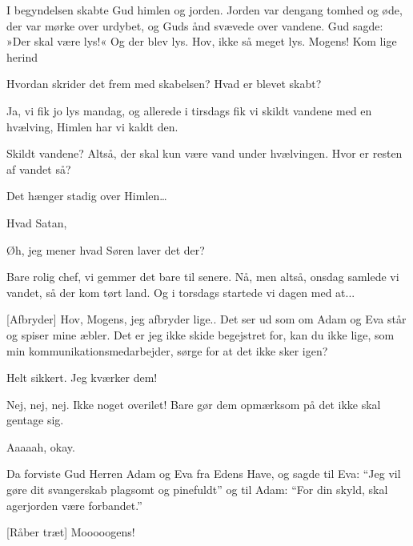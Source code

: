 \documentclass[a4paper,11pt]{article}
\begin{document}
\begin{sketch}

 I begyndelsen skabte Gud himlen og jorden. Jorden var dengang tomhed og øde, der var mørke over urdybet, og Guds ånd svævede over vandene. Gud sagde: »Der skal være lys!« Og der blev lys.
 Hov, ikke så meget lys.
 Mogens! Kom lige herind


 Hvordan skrider det frem med skabelsen? Hvad er blevet skabt?

 Ja, vi fik jo lys mandag, og allerede i tirsdags fik vi skildt vandene med en hvælving, Himlen har vi kaldt den.

 Skildt vandene? Altså, der skal kun være vand under hvælvingen. Hvor er resten af vandet så?

 Det hænger stadig over Himlen…

 Hvad Satan,


 Øh, jeg mener hvad Søren laver det der?


 Bare rolig chef, vi gemmer det bare til senere.  Nå, men altså, onsdag samlede vi vandet, så der kom tørt land. Og i torsdags startede vi dagen med at... 

[Afbryder] Hov, Mogens, jeg afbryder lige.. Det ser ud som om Adam og Eva står og spiser mine æbler. Det er jeg ikke skide begejstret for, kan du ikke lige, som min kommunikationsmedarbejder, sørge for at det ikke sker igen? 


 Helt sikkert. Jeg kværker dem!

 Nej, nej, nej. Ikke noget overilet! Bare gør dem opmærksom på det ikke skal gentage sig.

 Aaaaah, okay. 

 Da forviste Gud Herren Adam og Eva fra Edens Have, og sagde til Eva: “Jeg vil gøre dit svangerskab plagsomt og pinefuldt” og til Adam: “For din skyld, skal agerjorden være forbandet.”

[Råber træt] Mooooogens! 



\end{sketch}
\end{document}
